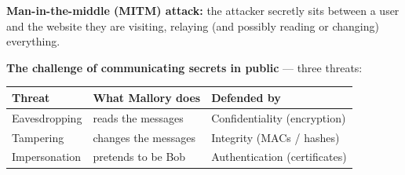 \textbf{Man-in-the-middle (MITM) attack:} the attacker secretly sits between a user and the website they are visiting, relaying (and possibly reading or changing) everything.
\begin{center}
\end{center}

\textbf{The challenge of communicating secrets in public} --- three threats:
\begin{center}
\begin{tabular}{lll}
\toprule
Threat & What Mallory does & Defended by \\
\midrule
Eavesdropping & reads the messages & Confidentiality (encryption) \\
Tampering & changes the messages & Integrity (MACs / hashes) \\
Impersonation & pretends to be Bob & Authentication (certificates) \\
\bottomrule
\end{tabular}
\end{center}

